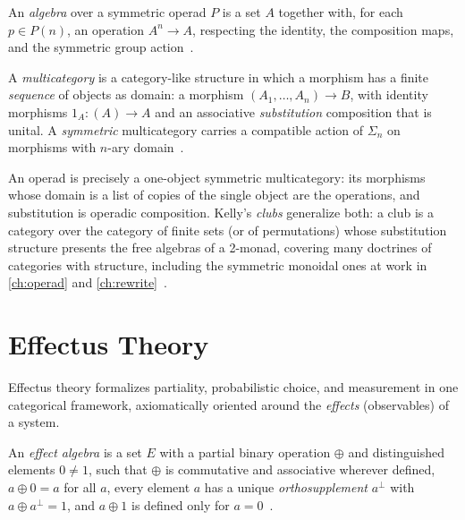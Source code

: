 \begin{definition}
An \emph{algebra} over a symmetric operad $P$ is a set $A$ together with, for
each $p \in P (n)$, an operation $A^n \to A$, respecting the identity, the
composition maps, and the symmetric group action~\cite{leinster,
arxiv-operads}.
\end{definition}

\begin{definition}[Multicategory]
A \emph{multicategory} is a category-like structure in which a morphism has a
finite \emph{sequence} of objects as domain: a morphism
$(A_1, \dots, A_n) \to B$, with identity morphisms $1_A \colon (A) \to A$ and
an associative \emph{substitution} composition that is unital. A
\emph{symmetric} multicategory carries a compatible action of $\Sigma_n$ on
morphisms with $n$-ary domain~\cite{leinster, arxiv-operads}.
\end{definition}

\begin{remark}
An operad is precisely a one-object symmetric multicategory: its morphisms
whose domain is a list of copies of the single object are the operations, and
substitution is operadic composition. Kelly's \emph{clubs} generalize both: a
club is a category over the category of finite sets (or of permutations)
whose substitution structure presents the free algebras of a 2-monad,
covering many doctrines of categories with structure, including the symmetric
monoidal ones at work in \autoref{ch:operad} and
\autoref{ch:rewrite}~\cite{kelly, leinster}.
\end{remark}

\section{Effectus Theory}\label{sec:prelim-effectus}

Effectus theory formalizes partiality, probabilistic choice, and measurement
in one categorical framework, axiomatically oriented around the
\emph{effects} (observables) of a system.

\begin{definition}
An \emph{effect algebra} is a set $E$ with a partial binary operation
$\oplus$ and distinguished elements $0 \neq 1$, such that $\oplus$ is
commutative and associative wherever defined, $a \oplus 0 = a$ for all $a$,
every element $a$ has a unique \emph{orthosupplement} $a^{\perp}$ with
$a \oplus a^{\perp} = 1$, and $a \oplus 1$ is defined only for
$a = 0$~\cite{arxiv-effectus}.
\end{definition}

